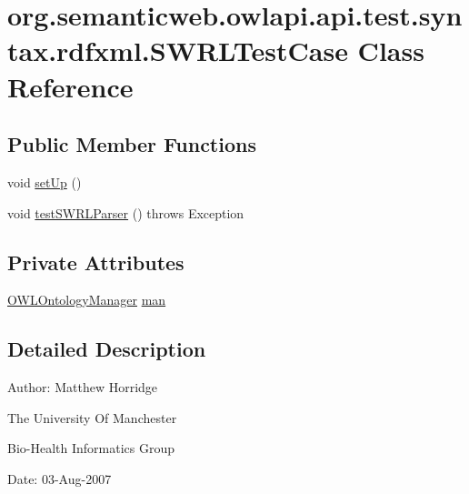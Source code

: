 \hypertarget{classorg_1_1semanticweb_1_1owlapi_1_1api_1_1test_1_1syntax_1_1rdfxml_1_1_s_w_r_l_test_case}{\section{org.\-semanticweb.\-owlapi.\-api.\-test.\-syntax.\-rdfxml.\-S\-W\-R\-L\-Test\-Case Class Reference}
\label{classorg_1_1semanticweb_1_1owlapi_1_1api_1_1test_1_1syntax_1_1rdfxml_1_1_s_w_r_l_test_case}
}
\subsection*{Public Member Functions}
\begin{DoxyCompactItemize}
\item 
void \hyperlink{classorg_1_1semanticweb_1_1owlapi_1_1api_1_1test_1_1syntax_1_1rdfxml_1_1_s_w_r_l_test_case_ac7d362037da055778be319afd685ba58}{set\-Up} ()
\item 
void \hyperlink{classorg_1_1semanticweb_1_1owlapi_1_1api_1_1test_1_1syntax_1_1rdfxml_1_1_s_w_r_l_test_case_acd7ae8ec98fd9227a011b6956aa4f29c}{test\-S\-W\-R\-L\-Parser} ()  throws Exception 
\end{DoxyCompactItemize}
\subsection*{Private Attributes}
\begin{DoxyCompactItemize}
\item 
\hyperlink{interfaceorg_1_1semanticweb_1_1owlapi_1_1model_1_1_o_w_l_ontology_manager}{O\-W\-L\-Ontology\-Manager} \hyperlink{classorg_1_1semanticweb_1_1owlapi_1_1api_1_1test_1_1syntax_1_1rdfxml_1_1_s_w_r_l_test_case_ac983dd675c07883a2a49cd3bd8948f50}{man}
\end{DoxyCompactItemize}


\subsection{Detailed Description}
Author\-: Matthew Horridge\par
 The University Of Manchester\par
 Bio-\/\-Health Informatics Group\par
 Date\-: 03-\/\-Aug-\/2007\par
 \par
 

